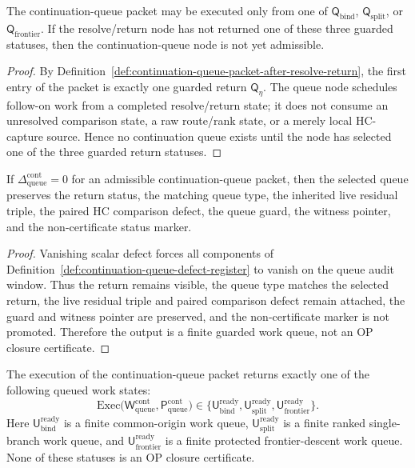 \begin{lemma}
\label{lem:resolve-return-output-is-queue-precondition}
The continuation-queue packet may be executed only from one of \(\mathsf Q_{\mathrm{bind}}\), \(\mathsf Q_{\mathrm{split}}\), or \(\mathsf Q_{\mathrm{frontier}}\). If the resolve/return node has not returned one of these three guarded statuses, then the continuation-queue node is not yet admissible.
\end{lemma}

\begin{proof}
By Definition~\ref{def:continuation-queue-packet-after-resolve-return}, the first entry of the packet is exactly one guarded return \(\mathsf Q_{\eta}\). The queue node schedules follow-on work from a completed resolve/return state; it does not consume an unresolved comparison state, a raw route/rank state, or a merely local HC-capture source. Hence no continuation queue exists until the node has selected one of the three guarded return statuses.
\end{proof}

\begin{lemma}
\label{lem:zero-continuation-queue-defect-preserves-queue-data}
If \(\Delta_{\mathrm{queue}}^{\mathrm{cont}}=0\) for an admissible continuation-queue packet, then the selected queue preserves the return status, the matching queue type, the inherited live residual triple, the paired HC comparison defect, the queue guard, the witness pointer, and the non-certificate status marker.
\end{lemma}

\begin{proof}
Vanishing scalar defect forces all components of Definition~\ref{def:continuation-queue-defect-register} to vanish on the queue audit window. Thus the return remains visible, the queue type matches the selected return, the live residual triple and paired comparison defect remain attached, the guard and witness pointer are preserved, and the non-certificate marker is not promoted. Therefore the output is a finite guarded work queue, not an OP closure certificate.
\end{proof}

\begin{definition}
\label{def:r22-continuation-queue-output}
The execution of the continuation-queue packet returns exactly one of the following queued work states:
\[
\mathrm{Exec}\bigl(\mathsf W_{\mathrm{queue}}^{\mathrm{cont}},
 \mathsf P_{\mathrm{queue}}^{\mathrm{cont}}\bigr)
\in
\{\mathsf U_{\mathrm{bind}}^{\mathrm{ready}},
 \mathsf U_{\mathrm{split}}^{\mathrm{ready}},
 \mathsf U_{\mathrm{frontier}}^{\mathrm{ready}}\}.
\]
Here \(\mathsf U_{\mathrm{bind}}^{\mathrm{ready}}\) is a finite common-origin work queue, \(\mathsf U_{\mathrm{split}}^{\mathrm{ready}}\) is a finite ranked single-branch work queue, and \(\mathsf U_{\mathrm{frontier}}^{\mathrm{ready}}\) is a finite protected frontier-descent work queue. None of these statuses is an OP closure certificate.
\end{definition}

